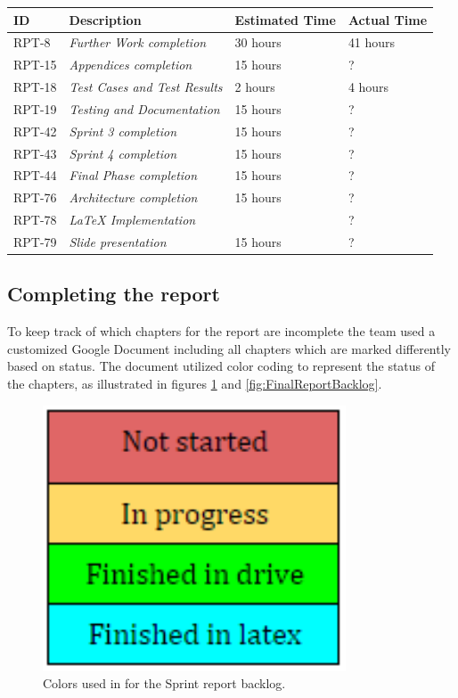 \begin{minipage}{\linewidth}
\setlength{\tabcolsep}{12pt}
\centering
{}
\begin{tabular}{|p{1cm}|p{4cm}|p{2cm}|p{2cm}|}
\hline
\cellcolor{gray!25} ID & \cellcolor{gray!25} Description & \cellcolor{gray!25} Estimated Time & \cellcolor{gray!25} Actual Time \\
\hline
RPT-8 & \it{Further Work completion} & 30 hours & 41 hours\\
RPT-15 & \it{Appendices completion} & 15 hours & ? \\
RPT-18 & \it{Test Cases and Test Results} &  2 hours & 4 hours \\
RPT-19 & \it{Testing and Documentation} & 15 hours & ? \\
RPT-42 & \it{Sprint 3 completion} & 15 hours & ? \\
RPT-43 & \it{Sprint 4 completion} & 15 hours & ? \\
RPT-44 & \it{Final Phase completion} & 15 hours & ? \\
RPT-76 & \it{Architecture completion} & 15 hours & ? \\
RPT-78 & \it{LaTeX Implementation} &  & ? \\
RPT-79 & \it{Slide presentation} & 15 hours & ? \\
\hline
\end{tabular}
\end{minipage}

\subsection{Completing the report}
\label{sec:FinalReport}

To keep track of which chapters for the report are incomplete the team used a customized Google Document including all chapters which are marked differently based on status. The document utilized color coding to represent the status of the chapters, as illustrated in figures \ref{fig:FinalColors} and \ref{fig:FinalReportBacklog}.

\begin{figure}[ht!]
\centering
\includegraphics[width=90mm]{./FinalSprint/img/Colors.png}
\caption{Colors used in for the Sprint report backlog. \label{fig:FinalColors}}
\end{figure}

